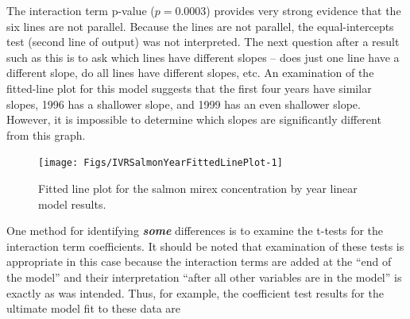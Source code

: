 \documentclass[10pt,openany]{book}\usepackage[]{graphicx}\usepackage[]{color}
\makeatletter
\newenvironment{kframe}{%
 \def\at@end@of@kframe{}%
 \ifinner\ifhmode%
  \def\at@end@of@kframe{\end{minipage}}%
  \begin{minipage}{\columnwidth}%
 \fi\fi%
 \def\FrameCommand##1{\hskip\@totalleftmargin \hskip-\fboxsep
 \colorbox{shadecolor}{##1}\hskip-\fboxsep
     \hskip-\linewidth \hskip-\@totalleftmargin \hskip\columnwidth}%
 \MakeFramed {\advance\hsize-\width
   \@totalleftmargin\z@ \linewidth\hsize
   \@setminipage}}%
 {\par\unskip\endMakeFramed%
 \at@end@of@kframe}
\newenvironment{knitrout}{}{} %
\makeatother
\begin{document}
The interaction term p-value ($p=0.0003$) provides very strong evidence that the six lines are not parallel.  Because the lines are not parallel, the equal-intercepts test (second line of output) was not interpreted.  The next question after a result such as this is to ask which lines have different slopes -- does just one line have a different slope, do all lines have different slopes, etc.  An examination of the fitted-line plot for this model  suggests that the first four years have similar slopes, 1996 has a shallower slope, and 1999 has an even shallower slope.  However, it is impossible to determine which slopes are significantly different from this graph.

\begin{knitrout}
\color{fgcolor}\begin{kframe}


{\ttfamily\noindent\itshape\color{messagecolor}{Loading required namespace: gplots}}\end{kframe}\begin{figure}[h]

{\centering \texttt{[image: Figs/IVRSalmonYearFittedLinePlot-1]} 

}

\caption[Fitted line plot for the salmon mirex concentration by year linear model results]{Fitted line plot for the salmon mirex concentration by year linear model results.}\label{fig:IVRSalmonYearFittedLinePlot}
\end{figure}


\end{knitrout}

One method for identifying \textbf{\emph{some}} differences is to examine the t-tests for the interaction term coefficients.  It should be noted that examination of these tests is appropriate in this case because the interaction terms are added at the ``end of the model'' and their interpretation ``after all other variables are in the model'' is exactly as was intended.  Thus, for example, the coefficient test results for the ultimate model fit to these data are
\end{document}
